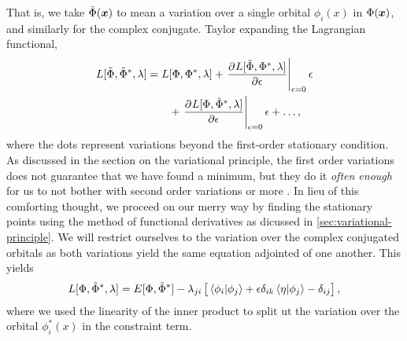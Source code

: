             That is, we take $\tilde{\Phi}(\boldsymbol{x})$ to mean a variation over a
            single orbital $\phi_i(x)$ in $\Phi(\boldsymbol{x})$, and similarly for the
            complex conjugate.
            Taylor expanding the Lagrangian functional,
            \begin{align}
                \lagrangianfunc{\tilde{\slat}, \tilde{\slat}^{*}, \lambda}
                &=
                \lagrangianfunc{\slat, \slat^{*}, \lambda}
                +
                \left.
                \dpd{
                    \lagrangianfunc{\tilde{\slat}, \slat^{*}, \lambda}
                }{\epsilon}
                \right\lvert_{\epsilon = 0}
                \epsilon
                \nonumber \\
                &\qquad
                +
                \left.
                \dpd{
                    \lagrangianfunc{\slat, \tilde{\slat}^{*}, \lambda}
                }{\epsilon}
                \right\lvert_{\epsilon = 0}
                \epsilon
                + \dots,
            \end{align}
            where the dots represent variations beyond the first-order
            stationary condition.
            As discussed in the section on the variational principle, the first
            order variations does not guarantee that we have found a minimum,
            but they do it \emph{often enough} for us to not bother with second
            order variations or more \cite{szabo1996modern}.
            In lieu of this comforting thought, we proceed on our merry way by
            finding the stationary points using the method of functional
            derivatives as dicussed in \autoref{sec:variational-principle}.
            We will restrict ourselves to the variation over the complex
            conjugated orbitals as both variations yield the same equation
            adjointed of one another.
            This yields
            \begin{align}
                L[\Phi, \tilde{\Phi}^{*}, \lambda]
                =
                E[\Phi, \tilde{\Phi}^{*}]
                - \lambda_{ji}\left[ 
                    \braket*{\phi_i}{\phi_j}
                    + \epsilon \delta_{ik}\braket*{\eta}{\phi_j}
                    - \delta_{ij}
                 \right],
            \end{align}
            where we used the linearity of the inner product to split ut the
            variation over the orbital $\phi^{*}_i(x)$ in the constraint term.
